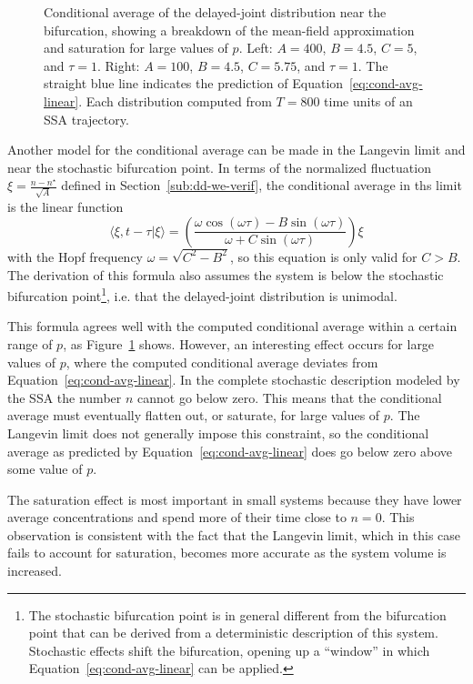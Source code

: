 \documentclass[english,letterpaper,12pt]{report}
\begin{document}
\begin{doublespacing}
\begin{figure}
{\begin{subfigure}{3in}
    \end{subfigure}
    }
    \caption{Conditional average of the delayed-joint distribution near the bifurcation, showing a breakdown of the mean-field approximation and saturation for large values of $p$. Left: $A=400$, $B=4.5$, $C=5$, and $\tau=1$. Right: $A=100$, $B=4.5$, $C=5.75$, and $\tau=1$. The straight blue line indicates the prediction of Equation~\eqref{eq:cond-avg-linear}. Each distribution computed from $T=800$ time units of an SSA trajectory.}
    \label{fig:ddjd-bif}
\end{figure}

Another model for the conditional average can be made in the Langevin limit and near the stochastic bifurcation point. In terms of the normalized fluctuation $\xi = \frac{n - n^\star}{\sqrt{A}}$ defined in Section~\ref{sub:dd-we-verif}, the conditional average in ths limit is the linear function \cite{delayed-deg-notes}
\begin{equation}
    \langle \xi, t - \tau | \xi \rangle = \left( \frac{\omega \cos(\omega \tau) - B \sin(\omega \tau)}{\omega + C \sin(\omega \tau)}\right)\xi 
    \label{eq:cond-avg-linear}
\end{equation}
with the Hopf frequency $\omega = \sqrt{C^2 - B^2}$, so this equation is only valid for $C > B$. The derivation of this formula also assumes the system is below the stochastic bifurcation point\footnote{The stochastic bifurcation point is in general different from the bifurcation point that can be derived from a deterministic description of this system. Stochastic effects shift the bifurcation, opening up a ``window'' in which Equation~\eqref{eq:cond-avg-linear} can be applied.}, i.e. that the delayed-joint distribution is unimodal.

This formula agrees well with the computed conditional average within a certain range of $p$, as Figure~\ref{fig:ddjd-bif} shows. However, an interesting effect occurs for large values of $p$, where the computed conditional average deviates from Equation~\ref{eq:cond-avg-linear}. In the complete stochastic description modeled by the SSA the number $n$ cannot go below zero. This means that the conditional average must eventually flatten out, or saturate, for large values of $p$. The Langevin limit does not generally impose this constraint, so the conditional average as predicted by Equation~\eqref{eq:cond-avg-linear} does go below zero above some value of $p$.

The saturation effect is most important in small systems because they have lower average concentrations and spend more of their time close to $n=0$. This observation is consistent with the fact that the Langevin limit, which in this case fails to account for saturation, becomes more accurate as the system volume is increased.


\end{doublespacing}
\end{document}
